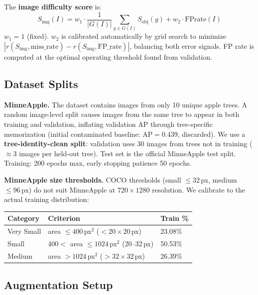 \documentclass[10pt, a4paper]{article}
\begin{document}
The \textbf{image difficulty score} is:
\begin{equation}
  S_{\text{img}}(I) = w_1 \cdot \frac{1}{|G(I)|}
    \sum_{g \in G(I)} S_{\text{obj}}(g)
    + w_2 \cdot \text{FPrate}(I)
  \label{eq:simg}
\end{equation}
$w_1 = 1$ (fixed). $w_2$ is calibrated automatically by grid search to
minimize $|r(S_{\text{img}},\text{miss\_rate})-r(S_{\text{img}},\text{FP\_rate})|$,
balancing both error signals.
FP rate is computed at the optimal operating threshold found from validation.

\subsection{Dataset Splits}

\textbf{MinneApple.}
The dataset contains images from only 10 unique apple trees.
A random image-level split causes images from the same tree to appear in
both training and validation, inflating validation AP through tree-specific
memorization (initial contaminated baseline: AP$=0.439$, discarded).
We use a \textbf{tree-identity-clean split}: validation uses 30 images
from trees not in training ($\approx$3 images per held-out tree).
Test set is the official MinneApple test split.
Training: 200 epochs max, early stopping patience 50 epochs.

\textbf{MinneApple size thresholds.}
COCO thresholds (small $\leq32$\,px, medium $\leq96$\,px) do not suit
MinneApple at $720{\times}1280$ resolution.
We calibrate to the actual training distribution:

\begin{center}
\small
\begin{tabular}{lll}
\toprule
\textbf{Category} & \textbf{Criterion} & \textbf{Train \%} \\
\midrule
Very Small & area $\leq400$\,px$^2$ ($<20{\times}20$\,px) & 23.08\% \\
Small      & $400<$ area $\leq1024$\,px$^2$ (20--32\,px)  & 50.53\% \\
Medium     & area $>1024$\,px$^2$ ($>32{\times}32$\,px)   & 26.39\% \\
\bottomrule
\end{tabular}
\end{center}

\subsection{Augmentation Setup}
\end{document}
